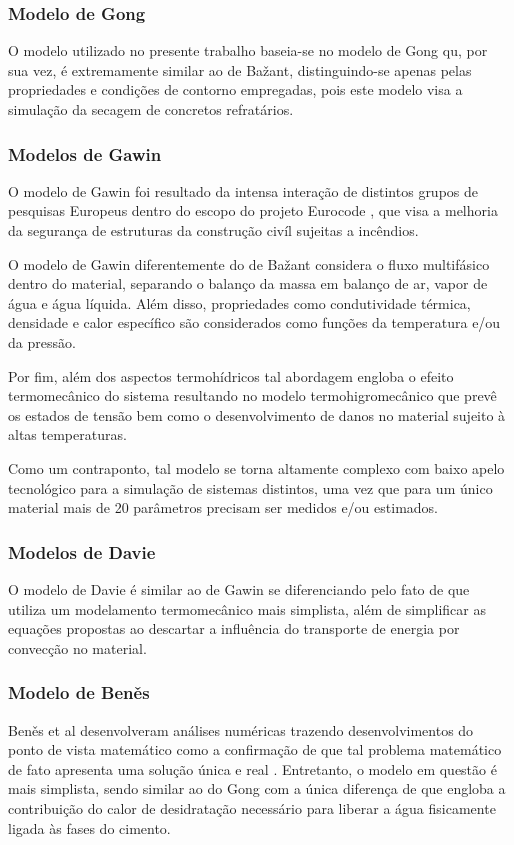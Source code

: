 \subsubsection{Modelo de Gong}
O modelo utilizado no presente trabalho baseia-se no modelo de Gong
\cite{Gong1995a} qu, por sua vez, é extremamente similar ao de Ba\v{z}ant,
distinguindo-se apenas pelas propriedades e condições de contorno
empregadas, pois este modelo visa a simulação da secagem de
concretos refratários.
    
    
\subsubsection{Modelos de Gawin}
O modelo de Gawin\cite{Gawin1999} foi resultado da intensa interação de
distintos grupos de pesquisas Europeus dentro do escopo do projeto Eurocode
\cite{Eurocode}, que visa a melhoria da segurança de estruturas da construção
civíl sujeitas a incêndios.

O modelo de Gawin diferentemente do de Ba\v{z}ant considera o fluxo multifásico
dentro do material, separando o balanço da massa em balanço de ar, vapor de água
e água líquida. Além disso, propriedades como condutividade térmica, densidade e
calor específico são considerados como funções da temperatura e/ou da pressão.

Por fim, além dos aspectos termohídricos tal abordagem engloba o efeito
termomecânico do sistema resultando no modelo termohigromecânico que prevê os
estados de tensão bem como o desenvolvimento de danos no material sujeito à
altas temperaturas.

Como um contraponto, tal modelo se torna altamente complexo com baixo apelo
tecnológico para a simulação de sistemas distintos, uma vez que para um único
material mais de 20 parâmetros precisam ser medidos e/ou estimados.
    
\subsubsection{Modelos de Davie}
O modelo de Davie é similar ao de Gawin se diferenciando pelo fato de que
utiliza um modelamento termomecânico mais simplista, além de simplificar as
equações propostas ao descartar a influência do transporte de energia por
convecção no material.
    
\subsubsection{Modelo de Ben\v{e}s}
Ben\v{e}s et al desenvolveram análises numéricas trazendo desenvolvimentos do
ponto de vista matemático como a confirmação de que tal problema matemático de
fato apresenta uma solução única e real \cite{Benes2013a}. Entretanto, o modelo
em questão é mais simplista, sendo similar ao do Gong com a única diferença de que
engloba a contribuição do calor de desidratação necessário para liberar a água
fisicamente ligada às fases do cimento.
    
